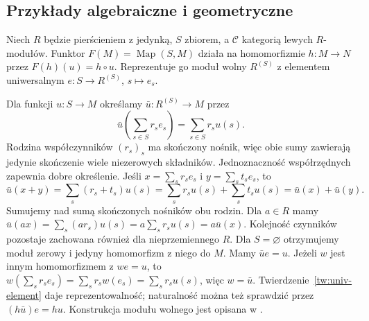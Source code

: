 \subsection{Przykłady algebraiczne i geometryczne}

\begin{przyklad}\label{cat:ex:free-module-rep}
Niech $R$ będzie pierścieniem z jedynką, $S$ zbiorem, a $\mathcal C$ kategorią lewych $R$-modułów. Funktor
$F(M)=\operatorname{Map}(S,M)$ działa na homomorfizmie $h:M\to N$ przez $F(h)(u)=h\circ u$. Reprezentuje go moduł wolny $R^{(S)}$ z elementem uniwersalnym $e:S\to R^{(S)}$, $s\mapsto e_s$.

Dla funkcji $u:S\to M$ określamy $\bar u:R^{(S)}\to M$ przez
\[
\bar u\left(\sum_{s\in S}r_se_s\right)=\sum_{s\in S}r_su(s).
\]
Rodzina współczynników $(r_s)_s$ ma skończony nośnik, więc obie sumy zawierają jedynie skończenie wiele niezerowych składników. Jednoznaczność współrzędnych zapewnia dobre określenie. Jeśli $x=\sum_s r_se_s$ i $y=\sum_s t_se_s$, to
\[
\bar u(x+y)=\sum_s(r_s+t_s)u(s)
=\sum_s r_su(s)+\sum_s t_su(s)=\bar u(x)+\bar u(y).
\]
Sumujemy nad sumą skończonych nośników obu rodzin. Dla $a\in R$ mamy
$\bar u(ax)=\sum_s(ar_s)u(s)=a\sum_s r_su(s)=a\bar u(x)$.
Kolejność czynników pozostaje zachowana również dla nieprzemiennego $R$. Dla $S=\varnothing$ otrzymujemy moduł zerowy i jedyny homomorfizm z niego do $M$. Mamy $\bar u e=u$. Jeżeli $w$ jest innym homomorfizmem z $we=u$, to
$w(\sum_s r_se_s)=\sum_s r_sw(e_s)=\sum_s r_su(s)$, więc $w=\bar u$. Twierdzenie~\ref{tw:univ-element} daje reprezentowalność; naturalność można też sprawdzić przez $(h\bar u)e=hu$. Konstrukcja modułu wolnego jest opisana w .
\end{przyklad}

